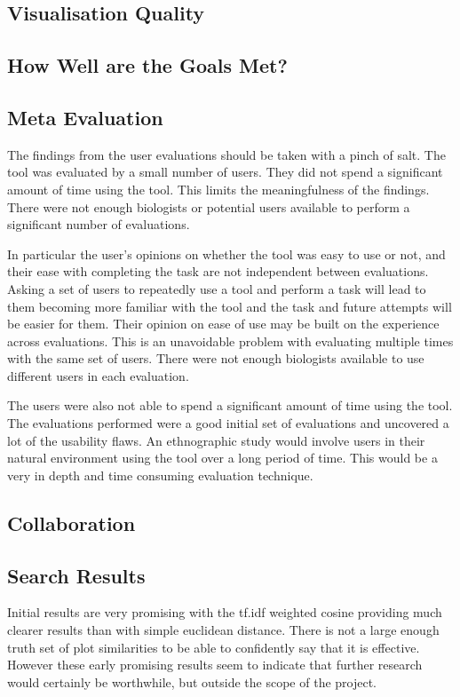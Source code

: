 \subsection{Visualisation Quality}


\subsection{How Well are the Goals Met?}




\subsection{Meta Evaluation}
The findings from the user evaluations should be taken with a pinch of salt.  The tool was evaluated by a small number of users.  They did not spend a significant amount of time using the tool.  This limits the meaningfulness of the findings.  There were not enough biologists or potential users available to perform a significant number of evaluations.

In particular the user's opinions on whether the tool was easy to use or not, and their ease with completing the task are not independent between evaluations.  Asking a set of users to repeatedly use a tool and perform a task will lead to them becoming more familiar with the tool and the task and future attempts will be easier for them.  Their opinion on ease of use may be built on the experience across evaluations.  This is an unavoidable problem with evaluating multiple times with the same set of users.  There were not enough biologists available to use different users in each evaluation.

The users were also not able to spend a significant amount of time using the tool.  The evaluations performed were a good initial set of evaluations and uncovered a lot of the usability flaws.  An ethnographic study would involve users in their natural environment using the tool over a long period of time.  This would be a very in depth and time consuming evaluation technique.

\subsection{Collaboration}

\subsection{Search Results}
Initial results are very promising with the tf.idf weighted cosine providing much clearer results than with simple euclidean distance.  There is not a large enough truth set of plot similarities to be able to confidently say that it is effective.  However these early promising results seem to indicate that further research would certainly be worthwhile, but outside the scope of the project.

